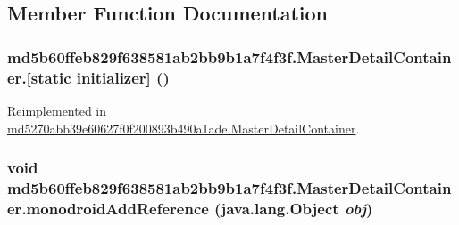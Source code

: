 \subsection{Member Function Documentation}
\hypertarget{classmd5b60ffeb829f638581ab2bb9b1a7f4f3f_1_1_master_detail_container_6c8732252530fc8d94a73921abbc50f8}{
\subsubsection[{[static initializer]}]{\setlength{\rightskip}{0pt plus 5cm}md5b60ffeb829f638581ab2bb9b1a7f4f3f.MasterDetailContainer.\mbox{[}static initializer\mbox{]} ()}}
\label{classmd5b60ffeb829f638581ab2bb9b1a7f4f3f_1_1_master_detail_container_6c8732252530fc8d94a73921abbc50f8}




Reimplemented in \hyperlink{classmd5270abb39e60627f0f200893b490a1ade_1_1_master_detail_container_cebd9434aa87b66b80bc49340b38a40d}{md5270abb39e60627f0f200893b490a1ade.MasterDetailContainer}.\hypertarget{classmd5b60ffeb829f638581ab2bb9b1a7f4f3f_1_1_master_detail_container_5f8aaba34799a0323fa0d77618dfae96}{
\subsubsection[{monodroidAddReference}]{\setlength{\rightskip}{0pt plus 5cm}void md5b60ffeb829f638581ab2bb9b1a7f4f3f.MasterDetailContainer.monodroidAddReference (java.lang.Object {\em obj})}}
\label{classmd5b60ffeb829f638581ab2bb9b1a7f4f3f_1_1_master_detail_container_5f8aaba34799a0323fa0d77618dfae96}




